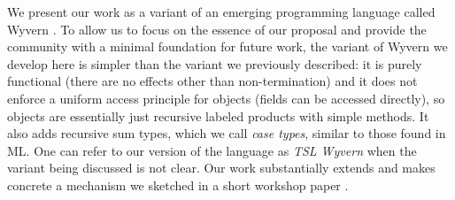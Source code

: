 We present our work as a variant of an emerging programming language called Wyvern \cite{Nistor:2013:WST:2489828.2489830}. To allow us to focus on the essence of our proposal and provide the community with a minimal foundation for future work, the variant of Wyvern we develop here is simpler than the variant we previously described: it is purely functional (there are no effects other than non-termination) and it does not enforce a uniform access principle for objects (fields can be accessed directly), so objects are essentially just recursive labeled products with simple methods. It also adds recursive sum types, which we call \emph{case types}, similar to those found in ML. One can refer to our version of the language as \emph{TSL Wyvern} when the variant being discussed is not clear. Our work substantially extends and makes concrete a mechanism we sketched in a short workshop paper \cite{Omar:2013:TWP:2489812.2489815}. 

